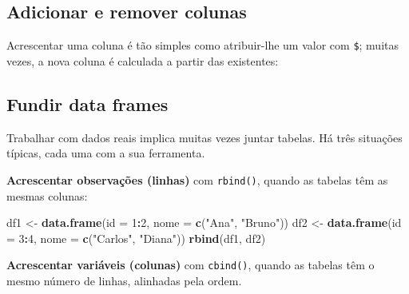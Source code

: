 \documentclass[
  portuguese,
  11pt,
  openany]{book}
\newenvironment{Shaded}{\begin{snugshade}}{\end{snugshade}}
\newcommand{\AttributeTok}[1]{\textcolor[rgb]{0.13,0.29,0.53}{#1}}
\newcommand{\CommentTok}[1]{\textcolor[rgb]{0.56,0.35,0.01}{\textit{#1}}}
\newcommand{\ConstantTok}[1]{\textcolor[rgb]{0.56,0.35,0.01}{#1}}
\newcommand{\DecValTok}[1]{\textcolor[rgb]{0.00,0.00,0.81}{#1}}
\newcommand{\FloatTok}[1]{\textcolor[rgb]{0.00,0.00,0.81}{#1}}
\newcommand{\FunctionTok}[1]{\textcolor[rgb]{0.13,0.29,0.53}{\textbf{#1}}}
\newcommand{\NormalTok}[1]{#1}
\newcommand{\OtherTok}[1]{\textcolor[rgb]{0.56,0.35,0.01}{#1}}
\newcommand{\SpecialCharTok}[1]{\textcolor[rgb]{0.81,0.36,0.00}{\textbf{#1}}}
\newcommand{\StringTok}[1]{\textcolor[rgb]{0.31,0.60,0.02}{#1}}
\begin{document}
\subsection{Adicionar e remover colunas}\label{adicionar-e-remover-colunas}

Acrescentar uma coluna é tão simples como atribuir-lhe um valor com \texttt{\$}; muitas
vezes, a nova coluna é calculada a partir das existentes:

\begin{Shaded}
\end{Shaded}

\subsection{Fundir data frames}\label{fundir-data-frames}

Trabalhar com dados reais implica muitas vezes juntar tabelas. Há três situações
típicas, cada uma com a sua ferramenta.

\textbf{Acrescentar observações (linhas)} com \texttt{rbind()}, quando as tabelas têm as
mesmas colunas:

\begin{Shaded}
\begin{Highlighting}[]
\NormalTok{df1 }\OtherTok{\textless{}{-}} \FunctionTok{data.frame}\NormalTok{(}\AttributeTok{id =} \DecValTok{1}\SpecialCharTok{:}\DecValTok{2}\NormalTok{, }\AttributeTok{nome =} \FunctionTok{c}\NormalTok{(}\StringTok{"Ana"}\NormalTok{, }\StringTok{"Bruno"}\NormalTok{))}
\NormalTok{df2 }\OtherTok{\textless{}{-}} \FunctionTok{data.frame}\NormalTok{(}\AttributeTok{id =} \DecValTok{3}\SpecialCharTok{:}\DecValTok{4}\NormalTok{, }\AttributeTok{nome =} \FunctionTok{c}\NormalTok{(}\StringTok{"Carlos"}\NormalTok{, }\StringTok{"Diana"}\NormalTok{))}
\FunctionTok{rbind}\NormalTok{(df1, df2)}
\end{Highlighting}
\end{Shaded}

\textbf{Acrescentar variáveis (colunas)} com \texttt{cbind()}, quando as tabelas têm o mesmo
número de linhas, alinhadas pela ordem.
\end{document}
